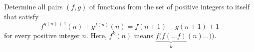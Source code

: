 Determine all pairs 
$(f,g)$
 of functions from the set of positive integers to itself that satisfy 
\[f^{g(n)+1}(n) + g^{f(n)}(n) = f(n+1) - g(n+1) + 1\]
 for every positive integer 
$n$.
 Here, 
$f^k(n)$
 means 
$\underbrace{f(f(\ldots f)}_{k}(n) \ldots ))$.
